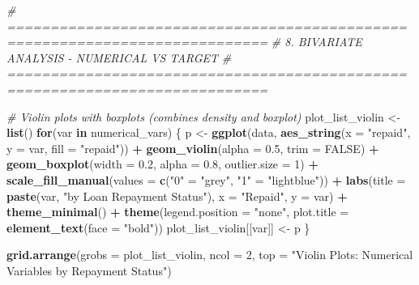 \documentclass[
]{article}
\newenvironment{Shaded}{\begin{snugshade}}{\end{snugshade}}
\newcommand{\AttributeTok}[1]{\textcolor[rgb]{0.13,0.29,0.53}{#1}}
\newcommand{\CommentTok}[1]{\textcolor[rgb]{0.56,0.35,0.01}{\textit{#1}}}
\newcommand{\ConstantTok}[1]{\textcolor[rgb]{0.56,0.35,0.01}{#1}}
\newcommand{\ControlFlowTok}[1]{\textcolor[rgb]{0.13,0.29,0.53}{\textbf{#1}}}
\newcommand{\DecValTok}[1]{\textcolor[rgb]{0.00,0.00,0.81}{#1}}
\newcommand{\FloatTok}[1]{\textcolor[rgb]{0.00,0.00,0.81}{#1}}
\newcommand{\FunctionTok}[1]{\textcolor[rgb]{0.13,0.29,0.53}{\textbf{#1}}}
\newcommand{\NormalTok}[1]{#1}
\newcommand{\OtherTok}[1]{\textcolor[rgb]{0.56,0.35,0.01}{#1}}
\newcommand{\SpecialCharTok}[1]{\textcolor[rgb]{0.81,0.36,0.00}{\textbf{#1}}}
\newcommand{\StringTok}[1]{\textcolor[rgb]{0.31,0.60,0.02}{#1}}
\begin{document}
\begin{Shaded}
\begin{Highlighting}[]
\CommentTok{\# ============================================================================}
\CommentTok{\# 8. BIVARIATE ANALYSIS {-} NUMERICAL VS TARGET}
\CommentTok{\# ============================================================================}

\CommentTok{\# Violin plots with boxplots (combines density and boxplot)}
\NormalTok{plot\_list\_violin }\OtherTok{\textless{}{-}} \FunctionTok{list}\NormalTok{()}
\ControlFlowTok{for}\NormalTok{(var }\ControlFlowTok{in}\NormalTok{ numerical\_vars) \{}
\NormalTok{  p }\OtherTok{\textless{}{-}} \FunctionTok{ggplot}\NormalTok{(data, }\FunctionTok{aes\_string}\NormalTok{(}\AttributeTok{x =} \StringTok{"repaid"}\NormalTok{, }\AttributeTok{y =}\NormalTok{ var, }\AttributeTok{fill =} \StringTok{"repaid"}\NormalTok{)) }\SpecialCharTok{+}
    \FunctionTok{geom\_violin}\NormalTok{(}\AttributeTok{alpha =} \FloatTok{0.5}\NormalTok{, }\AttributeTok{trim =} \ConstantTok{FALSE}\NormalTok{) }\SpecialCharTok{+}
    \FunctionTok{geom\_boxplot}\NormalTok{(}\AttributeTok{width =} \FloatTok{0.2}\NormalTok{, }\AttributeTok{alpha =} \FloatTok{0.8}\NormalTok{, }\AttributeTok{outlier.size =} \DecValTok{1}\NormalTok{) }\SpecialCharTok{+}
    \FunctionTok{scale\_fill\_manual}\NormalTok{(}\AttributeTok{values =} \FunctionTok{c}\NormalTok{(}\StringTok{"0"} \OtherTok{=} \StringTok{"grey"}\NormalTok{, }\StringTok{"1"} \OtherTok{=} \StringTok{"lightblue"}\NormalTok{)) }\SpecialCharTok{+}
    \FunctionTok{labs}\NormalTok{(}\AttributeTok{title =} \FunctionTok{paste}\NormalTok{(var, }\StringTok{"by Loan Repayment Status"}\NormalTok{),}
         \AttributeTok{x =} \StringTok{"Repaid"}\NormalTok{, }\AttributeTok{y =}\NormalTok{ var) }\SpecialCharTok{+}
    \FunctionTok{theme\_minimal}\NormalTok{() }\SpecialCharTok{+}
    \FunctionTok{theme}\NormalTok{(}\AttributeTok{legend.position =} \StringTok{"none"}\NormalTok{,}
          \AttributeTok{plot.title =} \FunctionTok{element\_text}\NormalTok{(}\AttributeTok{face =} \StringTok{"bold"}\NormalTok{))}
\NormalTok{  plot\_list\_violin[[var]] }\OtherTok{\textless{}{-}}\NormalTok{ p}
\NormalTok{\}}

\FunctionTok{grid.arrange}\NormalTok{(}\AttributeTok{grobs =}\NormalTok{ plot\_list\_violin, }\AttributeTok{ncol =} \DecValTok{2}\NormalTok{, }
             \AttributeTok{top =} \StringTok{"Violin Plots: Numerical Variables by Repayment Status"}\NormalTok{)}
\end{Highlighting}
\end{Shaded}
\end{document}
